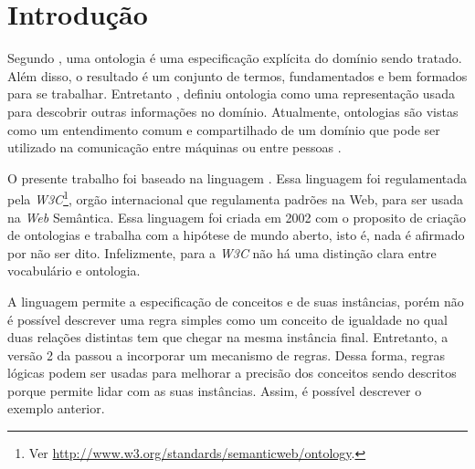 \chapter{Introdução}


Segundo \citet{gruber1993translation}, uma ontologia é uma especificação
explícita do domínio sendo tratado. Além disso, o resultado é um conjunto de
termos, fundamentados e bem formados para se trabalhar. Entretanto
\citet{ontoly2004Approach}, definiu ontologia como uma representação usada
para descobrir outras informações no domínio. Atualmente, ontologias são
vistas como um entendimento comum e compartilhado de um domínio que pode ser
utilizado na comunicação entre máquinas ou entre pessoas
\cite{wks2008towards}.


O presente trabalho foi baseado na linguagem \OWL. Essa linguagem foi
regulamentada pela \emph{W3C}\footnote{Ver
\url{http://www.w3.org/standards/semanticweb/ontology}.}, orgão internacional
que regulamenta padrões na Web, para ser usada na \emph{Web} Semântica. Essa
linguagem foi criada em 2002 com o proposito de criação de ontologias e
trabalha com a hipótese de mundo aberto, isto é, nada é afirmado por não ser
dito. Infelizmente, para a \emph{W3C} não há uma distinção clara entre vocabulário e
ontologia.

A linguagem \OWL permite a especificação de conceitos e de suas instâncias,
porém não é possível descrever uma regra simples como um conceito de igualdade
no qual duas relações distintas tem que chegar na mesma instância final.
%
Entretanto, a versão 2 da \OWL passou a incorporar um mecanismo de regras.
Dessa forma, regras lógicas podem ser usadas para melhorar a precisão dos
conceitos sendo descritos porque permite lidar com as suas instâncias. Assim,
é possível descrever o exemplo anterior.

